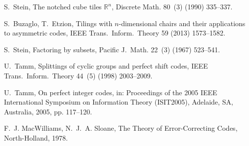 \documentclass[sort&compress]{elsarticle}
\begin{document}
\begin{thebibliography}{19}
S.~Stein, The notched cube tiles {$\mathbb{R}^n$}, Discrete Math. 80~(3) (1990)
  335--337.

S.~Buzaglo, T.~Etzion, Tilings with {$n$}-dimensional chairs and their
  applications to asymmetric codes, IEEE Trans.~Inform.~Theory 59 (2013)
  1573--1582.

S.~Stein, Factoring by subsets, Pacific J.~Math. 22~(3) (1967) 523--541.

U.~Tamm, Splittings of cyclic groups and perfect shift codes, IEEE
  Trans.~Inform.~Theory 44~(5) (1998) 2003--2009.

U.~Tamm, On perfect integer codes, in: Proceedings of the 2005 IEEE
  International Symposium on Information Theory (ISIT2005), Adelaide, SA,
  Australia, 2005, pp. 117--120.

F.~J. MacWilliams, N.~J.~A. Sloane, The Theory of Error-Correcting Codes,
  North-Holland, 1978.

\end{thebibliography}
\end{document}
